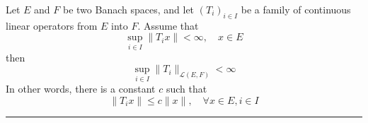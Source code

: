 \begin{thm} Let $E$ and $F$ be two Banach spaces, and let $(T_i)_{i\in I}$ be a family of continuous linear operators from $E$ into $F$. Assume that
\begin{equation}
    \sup_{i\in I}\|T_i x\|<\infty,\quad x\in E
\end{equation}
then
\begin{equation}
    \sup_{i\in I}\|T_i\|_{\mathcal{L}(E,F)}<\infty
\end{equation}
In other words, there is a constant $c$ such that
\begin{equation}
    \|T_i x\|\leq c\|x\|,\quad \forall x\in E, i\in I
\end{equation}
\end{thm}
\noindent\rule{\textwidth}{1pt}
\newline